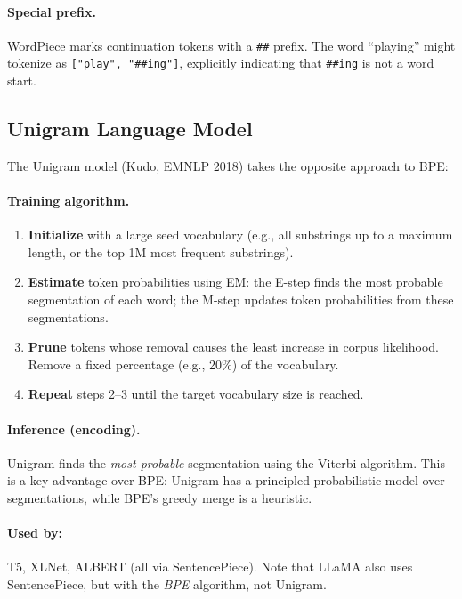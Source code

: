 \paragraph{Special prefix.}
WordPiece marks continuation tokens with a \texttt{\#\#} prefix.  The word
``playing'' might tokenize as \texttt{["play", "\#\#ing"]}, explicitly indicating that
\texttt{\#\#ing} is not a word start.

\subsection{Unigram Language Model}
\label{sec:unigram}

The Unigram model (Kudo, EMNLP 2018) takes the opposite approach to BPE:

\paragraph{Training algorithm.}
\begin{enumerate}
    \item \textbf{Initialize} with a large seed vocabulary (e.g., all substrings up to
          a maximum length, or the top 1M most frequent substrings).
    \item \textbf{Estimate} token probabilities using EM: the E-step finds the most
          probable segmentation of each word; the M-step updates token probabilities
          from these segmentations.
    \item \textbf{Prune} tokens whose removal causes the least increase in corpus
          likelihood.  Remove a fixed percentage (e.g., 20\%) of the vocabulary.
    \item \textbf{Repeat} steps 2--3 until the target vocabulary size is reached.
\end{enumerate}

\paragraph{Inference (encoding).}
Unigram finds the \emph{most probable} segmentation using the Viterbi algorithm.  This
is a key advantage over BPE: Unigram has a principled probabilistic model over
segmentations, while BPE's greedy merge is a heuristic.

\paragraph{Used by:} T5, XLNet, ALBERT (all via SentencePiece).  Note that LLaMA also
uses SentencePiece, but with the \emph{BPE} algorithm, not Unigram.

